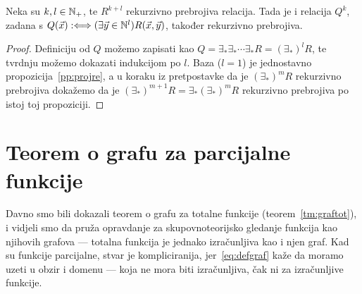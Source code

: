 \begin{korolar}[{name=[višestruka projekcija čuva rekurzivnu prebrojivost]}]\label{kor:projre}
Neka su $k,l\in{\mathbb N}_+$, te $R^{k+l}$ rekurzivno prebrojiva relacija. Tada je i relacija $Q^k$, zadana s $Q(\vec x):\Longleftrightarrow(\exists\vec y\in{\mathbb N}^l)R(\vec x,\vec y)$, također rekurzivno prebrojiva.
\end{korolar}
\begin{proof}
%
Definiciju od $Q$ možemo zapisati kao $Q=\exists_*\exists_*\dotsi\exists_*R=(\exists_*\!)^lR$, 
te tvrdnju možemo dokazati indukcijom po $l$. Baza ($l=1$) je jednostavno propozicija~\ref{pp:projre}, a u koraku iz pretpostavke da je $(\exists_*\!)^mR$ rekurzivno prebrojiva dokažemo da je $(\exists_*\!)^{m+1}R=\exists_*(\exists_*\!)^mR$ rekurzivno prebrojiva po istoj toj propoziciji.
\end{proof}

\section{Teorem o grafu za parcijalne funkcije}

Davno smo bili dokazali teorem o grafu za totalne funkcije (teorem~\ref{tm:graftot}), i vidjeli smo da pruža opravdanje za skupovnoteorijsko gledanje funkcija kao njihovih grafova --- totalna funkcija je jednako izračunljiva kao i njen graf. Kad su funkcije parcijalne, stvar je  kompliciranija, jer~\eqref{eq:defgraf} kaže da moramo uzeti u obzir i domenu --- koja ne mora biti izračunljiva, čak ni za izračunljive funkcije.

